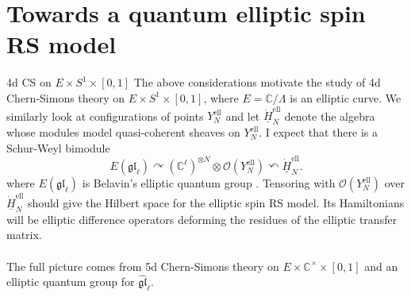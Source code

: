 \documentclass[11pt]{beamer}
\theoremstyle{remark}
\theoremstyle{remark}
\newcommand{\C}{\mathbb{C}}
\begin{document}
\section{Towards a quantum elliptic spin RS model}

\begin{frame}{4d CS on $E \times S^1 \times [0,1]$}
The above considerations motivate the study of 4d Chern-Simons theory on $E \times S^1 \times [0,1]$, where $E = \C/\Lambda$ is an elliptic curve. We similarly look at configurations of points $Y_N^\text{ell}$ and let $\underline{\dot H}_N^\text{ell}$ denote the algebra whose modules model quasi-coherent sheaves on $Y_N^\text{ell}$. I expect that there is a Schur-Weyl bimodule
\begin{equation*}
E(\mathfrak{gl}_\ell) \curvearrowright (\C^\ell)^{\otimes N} \otimes \mathcal{O}(Y_N^\text{ell}) \curvearrowleft \underline{\dot H}_N^\text{ell}.
\end{equation*}
where $E(\mathfrak{gl}_\ell)$ is Belavin's elliptic quantum group \cite{article:costello:2018b,article:etingof:1998}. Tensoring with $\mathcal{O}(Y_N^\text{ell})$ over $\underline{\dot H}_N^\text{ell}$ should give the Hilbert space for the elliptic spin RS model. Its Hamiltonians will be elliptic difference operators deforming the residues of the elliptic transfer matrix.
\\~\\
The full picture comes from 5d Chern-Simons theory on $E \times \C^\times \times [0,1]$ and an elliptic quantum group for $\widehat{\mathfrak{gl}}_\ell$.
\end{frame}

\begin{frame}[allowframebreaks]


\end{frame}
\end{document}
